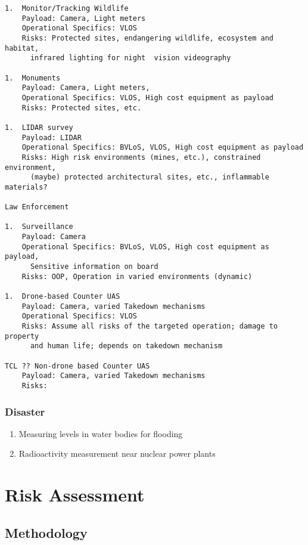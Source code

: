 \documentclass{ua_wgs_base}
\begin{document}
\begin{verbatim}
1.  Monitor/Tracking Wildlife
    Payload: Camera, Light meters
    Operational Specifics: VLOS
    Risks: Protected sites, endangering wildlife, ecosystem and habitat, 
      infrared lighting for night  vision videography

1.  Monuments
    Payload: Camera, Light meters, 
    Operational Specifics: VLOS, High cost equipment as payload 
    Risks: Protected sites, etc.

1.  LIDAR survey
    Payload: LIDAR
    Operational Specifics: BVLoS, VLOS, High cost equipment as payload
    Risks: High risk environments (mines, etc.), constrained environment, 
      (maybe) protected architectural sites, etc., inflammable materials?

Law Enforcement

1.  Surveillance
    Payload: Camera
    Operational Specifics: BVLoS, VLOS, High cost equipment as payload, 
      Sensitive information on board
    Risks: OOP, Operation in varied environments (dynamic)

1.  Drone-based Counter UAS
    Payload: Camera, varied Takedown mechanisms
    Operational Specifics: VLOS
    Risks: Assume all risks of the targeted operation; damage to property 
      and human life; depends on takedown mechanism

TCL ?? Non-drone based Counter UAS
    Payload: Camera, varied Takedown mechanisms
    Risks: 

\end{verbatim}


\subsection{Disaster}
\begin{enumerate}
  \item Measuring levels in water bodies for flooding
  \item Radioactivity measurement near nuclear power plants
\end{enumerate}


\cleardoublepage{}

\chapter{Risk Assessment}

\section{Methodology}
\end{document}
